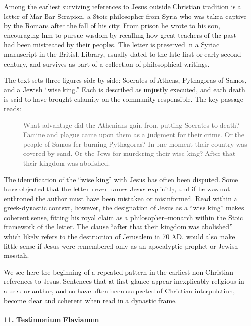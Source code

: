 Among the earliest surviving references to Jesus outside Christian tradition is a letter of Mar Bar Serapion, a Stoic philosopher from Syria who was taken captive by the Romans after the fall of his city.
From prison he wrote to his son, encouraging him to pursue wisdom by recalling how great teachers of the past had been mistreated by their peoples.
The letter is preserved in a Syriac manuscript in the British Library, usually dated to the late first or early second century, and survives as part of a collection of philosophical writings.

The text sets three figures side by side: Socrates of Athens, Pythagoras of Samos, and a Jewish “wise king.”
Each is described as unjustly executed, and each death is said to have brought calamity on the community responsible.
The key passage reads:
\begin{quote}
    What advantage did the Athenians gain from putting Socrates to death?
    Famine and plague came upon them as a judgment for their crime.
    Or the people of Samos for burning Pythagoras?
    In one moment their country was covered by sand.
    Or the Jews for murdering their wise king?
    After that their kingdom was abolished.
\end{quote}

The identification of the “wise king” with Jesus has often been disputed.
Some have objected that the letter never names Jesus explicitly, and if he was not enthroned the author must have been mistaken or misinformed.
Read within a greek-dynastic context, however, the designation of Jesus as a “wise king” makes coherent sense, fitting his royal claim as a philosopher–monarch within the Stoic framework of the letter.
The clause “after that their kingdom was abolished” which likely refers to the destruction of Jerusalem in 70 AD, would also make little sense if Jesus were remembered only as an apocalyptic prophet or Jewish messiah.


We see here the beginning of a repeated pattern in the earliest non-Christian references to Jesus.
Sentences that at first glance appear inexplicably religious in a secular author, and so have often been suspected of Christian interpolation, become clear and coherent when read in a dynastic frame.

\paragraph{11.
Testimonium Flavianum}\label{par:testimonium-flavianum}

